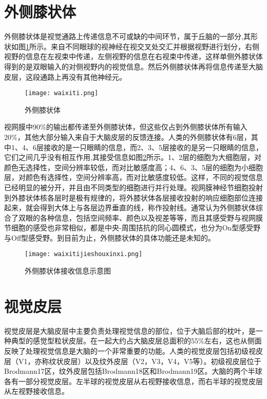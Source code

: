 \documentclass[a4paper,12pt]{article}
\begin{document}
\section{外侧膝状体}

外侧膝状体是视觉通路上传递信息不可或缺的中间环节\cite{5:article}，属于丘脑的一部分,其形状如图\ref{fig 7}所示。来自不同眼球的视神经在视交叉处交汇并根据视野进行划分，右侧视野的信息在左视束中传递，左侧视野的信息在右视束中传递，这样单侧外膝状体得到的是双眼输入的对侧视野内的视觉信息。然后外侧膝状体再将信息传递至大脑皮层，这段通路上再没有其他神经元。

\begin{figure}[!htb]
\centering
\texttt{[image: waixiti.png]}
\caption{外侧膝状体}\label{fig 7} 
\end{figure}


视网膜中90\%的输出都传递至外侧膝状体，但这些仅占到外侧膝状体所有输入20\%，其他大部分输入来自于大脑皮层的反馈连接\cite{13:misc}。人类的外侧膝状体有6层，其中1、4、6层接收的是一只眼睛的信息，而2、3、5层接收的是另一只眼睛的信息，它们之间几乎没有相互作用,其接受信息如图\ref{fig 8}所示。1、2层的细胞为大细胞层，对颜色无选择性，空间分辨率较低，而对比敏感度高；4、6、3、5层的细胞为小细胞层，对颜色有选择性，空间分辨率高，而对比敏感度较低。这样，不同的视觉信息已经明显的被分开，并且由不同类型的细胞进行并行处理。视网膜神经节细胞投射到外膝状体核各层时是极有规律的，将外膝状体各层接收投射的响应细胞部位连接起来，就会得到大体上与各层边界垂直的线，称作投射线。通常认为外侧膝状体综合了双眼的各种信息，包括空间频率、颜色以及视差等等，而且其感受野与视网膜节细胞的感受也非常相似，都是中央-周围拮抗的同心圆模式，也分为On型感受野与Off型感受野。到目前为止，外侧膝状体的具体功能还是未知的。

\begin{figure}[!htb]
\centering
\texttt{[image: waixitijieshouxinxi.png]}
\caption{外侧膝状体接收信息示意图}\label{fig 8} 
\end{figure}

\section{视觉皮层}


视觉皮层是大脑皮层中主要负责处理视觉信息的部位，位于大脑后部的枕叶，是一种典型的感觉型粒状皮层。在一起大约占大脑皮层总面积的55\%左右，这也从侧面反映了处理视觉信息是大脑的一个非常重要的功能。人类的视觉皮层\cite{15:book}包括初级视皮层（V1，亦称纹状皮层）以及纹外皮层（V2，V3，V4，V5等）。初级视皮层位于Brodmann17区，纹外皮层包括Brodmann18区和Brodmann19区。大脑的两个半球各有一部分视觉皮层。左半球的视觉皮层从右视野接收信息，而右半球的视觉皮层从左视野接收信息\cite{12:book}。
\end{document}
